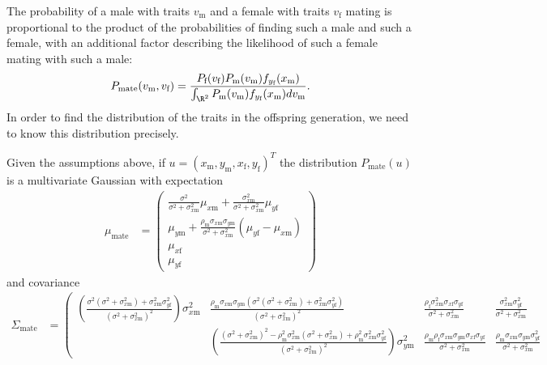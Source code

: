 \documentclass{article}
\newcommand{\x}[1]{\text{#1}}
\begin{document}
The probability of a male with traits $v_\x{m}$ and a female with traits $v_\x{f}$ mating is proportional to the product of the probabilities of finding such a male and such a female, with an additional factor describing the likelihood of such a female mating with such a male:
\begin{equation} \label{model}
P_\x{mate}(v_\x{m},v_\x{f})=\frac{P_\x{f}(v_\x{f})P_\x{m}(v_\x{m})f_{y_\x{f}}(x_\x{m})}{\int_{\R^2} P_\x{m}(v_\x{m})f_{y_\x{f}}(x_\x{m})dv_\x{m} }.
\end{equation}
In order to find the distribution of the traits in the offspring generation, we need to know this distribution precisely.

\begin{claim} \label{covariance}
Given the assumptions above, if $u=(x_\x{m},y_\x{m},x_\x{f},y_\x{f})^T$ the distribution $P_\text{mate}(u)$ is a multivariate Gaussian with expectation 
\begin{align*}
\mu_\text{mate}&=\left(\begin{array}{cc} \frac{\sigma^2}{\sigma^2+\sigma_{x\x{m}}^2}\mu_{x\x{m}}+\frac{\sigma_{x\x{m}}^2}{\sigma^2+\sigma_{x\x{m}}^2}\mu_{y\x{f}} 
\\ \mu_{y\x{m}}+\frac{\rho_\x{m}\sigma_{x\x{m}}\sigma_{y\x{m}}}{\sigma^2+\sigma_{x\x{m}}^2}(\mu_{y\x{f}}-\mu_{x\x{m}})
\\ \mu_{x\x{f}}
\\ \mu_{y\x{f}}
 \end{array}\right)
\end{align*}
and covariance 
\begin{align*}
\Sigma_\text{mate}&=\left(\begin{array}{cccc}\left(\frac{\sigma^2(\sigma^2+\sigma_{x\x{m}}^2)+\sigma_{x\x{m}}^2\sigma_{y\x{f}}^2}{(\sigma^2+\sigma_{x\x{m}}^2)^2}\right)\sigma_{x\x{m}}^2 & \frac{\rho_\x{m}\sigma_{x\x{m}}\sigma_{y\x{m}}(\sigma^2(\sigma^2+\sigma_{x\x{m}}^2)+\sigma_{x\x{m}}^2\sigma_{y\x{f}}^2)}{(\sigma^2+\sigma_{x\x{m}}^2)^2} & \frac{\rho_\x{f}\sigma_{x\x{m}}^2\sigma_{x\x{f}}\sigma_{y\x{f}}}{\sigma^2+\sigma_{x\x{m}}^2} &  \frac{\sigma_{x\x{m}}^2\sigma_{y\x{f}}^2}{\sigma^2+\sigma_{x\x{m}}^2}
\\ & \left(\frac{(\sigma^2+\sigma_{x\x{m}}^2)^2-\rho_\x{m}^2\sigma_{x\x{m}}^2(\sigma^2+\sigma_{x\x{m}}^2)+\rho_\x{m}^2\sigma_{x\x{m}}^2\sigma_{y\x{f}}^2}{(\sigma^2+\sigma_{x\x{m}}^2)^2}\right)\sigma_{y\x{m}}^2 & \frac{\rho_\x{m}\rho_\x{f}\sigma_{x\x{m}}\sigma_{y\x{m}}\sigma_{x\x{f}}\sigma_{y\x{f}}}{\sigma^2+\sigma_{x\x{m}}^2}& \frac{\rho_\x{m}\sigma_{x\x{m}}\sigma_{y\x{m}}\sigma_{y\x{f}}^2}{\sigma^2+\sigma_{x\x{m}}^2}

\end{array}
\end{align*}
\end{claim}
\end{document}
